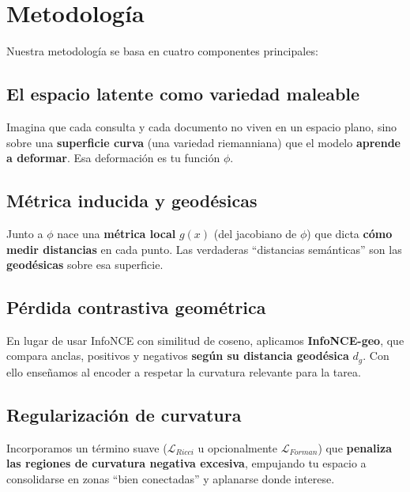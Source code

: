 \section{Metodología}
Nuestra metodología se basa en cuatro componentes principales:

\subsection{El espacio latente como variedad maleable}
Imagina que cada consulta y cada documento no viven en un espacio plano, sino sobre una \textbf{superficie curva} (una variedad riemanniana) que el modelo \textbf{aprende a deformar}. Esa deformación es tu función $\phi$.

\subsection{Métrica inducida y geodésicas}
Junto a $\phi$ nace una \textbf{métrica local} $g(x)$ (del jacobiano de $\phi$) que dicta \textbf{cómo medir distancias} en cada punto. Las verdaderas “distancias semánticas” son las \textbf{geodésicas} sobre esa superficie.

\subsection{Pérdida contrastiva geométrica}
En lugar de usar InfoNCE con similitud de coseno, aplicamos \textbf{InfoNCE-geo}, que compara anclas, positivos y negativos \textbf{según su distancia geodésica} $d_g$. Con ello enseñamos al encoder a respetar la curvatura relevante para la tarea.

\subsection{Regularización de curvatura}
Incorporamos un término suave ($\mathcal L_{Ricci}$ u opcionalmente $\mathcal L_{Forman}$) que \textbf{penaliza las regiones de curvatura negativa excesiva}, empujando tu espacio a consolidarse en zonas “bien conectadas” y aplanarse donde interese.
